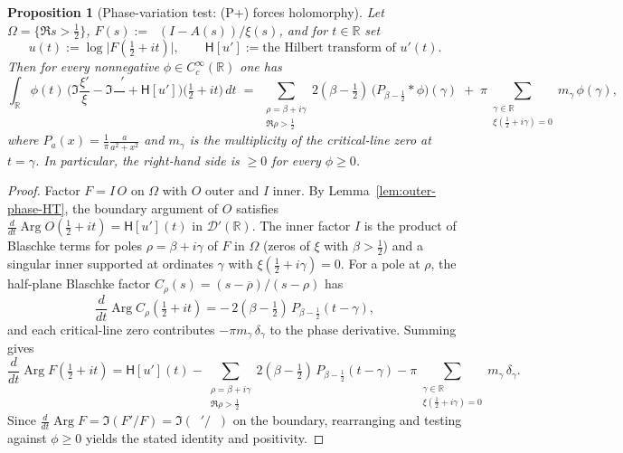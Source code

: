 \documentclass[11pt]{article}
\newtheorem{proposition}[theorem]{Proposition}
\theoremstyle{definition}
\theoremstyle{remark}
\newcommand{\R}{\mathbb{R}}
\DeclareMathOperator{\dettwo}{det_2}
\DeclareMathOperator{\Arg}{Arg}
\begin{document}
\begin{proposition}[Phase-variation test: (P+) forces holomorphy]\label{prop:Pplus-holomorphy}
Let \(\Omega=\{\Re s>\tfrac12\}\), \(F(s):=\dettwo(I-A(s))/\xi(s)\), and for \(t\in\R\) set
\[
 u(t):=\log\big|F(\tfrac12+it)\big|,\qquad
 \mathsf H[u']:=\text{the Hilbert transform of }u'(t).
\]
Then for every nonnegative \(\phi\in C_c^\infty(\R)\) one has
\[
\int_{\R}\!\phi(t)\,\Big(\Im\frac{\xi'}{\xi}-\Im\frac{\dettwo'}{\dettwo}+\mathsf H[u']\Big)\!\Big(\tfrac12+it\Big)\,dt
\;=\;\sum_{\substack{\rho=\beta+i\gamma\\ \Re\rho>\tfrac12}}\! 2(\beta-\tfrac12)\,\big(P_{\beta-\tfrac12}\!\ast\phi\big)(\gamma)
\;+\; \pi\!\!\sum_{\substack{\gamma\in\R\\ \xi(\tfrac12+i\gamma)=0}}\! m_\gamma\,\phi(\gamma),
\]
where \(P_a(x)=\frac{1}{\pi}\frac{a}{a^2+x^2}\) and \(m_\gamma\) is the multiplicity of the critical-line zero at \(t=\gamma\). In particular, the right-hand side is \(\ge 0\) for every \(\phi\ge 0\).
\end{proposition}
\begin{proof}
Factor \(F=I\,O\) on \(\Omega\) with \(O\) outer and \(I\) inner. By Lemma~\ref{lem:outer-phase-HT}, the boundary argument of \(O\) satisfies \(\frac{d}{dt}\Arg O(\tfrac12+it)=\mathsf H[u'](t)\) in \(\mathcal D'(\R)\). The inner factor \(I\) is the product of Blaschke terms for poles \(\rho=\beta+i\gamma\) of \(F\) in \(\Omega\) (zeros of \(\xi\) with \(\beta>\tfrac12\)) and a singular inner supported at ordinates \(\gamma\) with \(\xi(\tfrac12+i\gamma)=0\). For a pole at \(\rho\), the half-plane Blaschke factor \(C_\rho(s)=(s-\overline\rho)/(s-\rho)\) has
\[
\frac{d}{dt}\Arg C_\rho(\tfrac12+it)=-\,2(\beta-\tfrac12)\,P_{\beta-\tfrac12}(t-\gamma),
\]
and each critical-line zero contributes \(-\pi m_\gamma\,\delta_\gamma\) to the phase derivative. Summing gives
\[
\frac{d}{dt}\Arg F(\tfrac12+it)=\mathsf H[u'](t)
-\sum_{\substack{\rho=\beta+i\gamma\\ \Re\rho>\tfrac12}}\! 2(\beta-\tfrac12)\,P_{\beta-\tfrac12}(t-\gamma)
-\pi\!\!\sum_{\substack{\gamma\in\R\\ \xi(\tfrac12+i\gamma)=0}}\! m_\gamma\,\delta_\gamma.
\]
Since \(\frac{d}{dt}\Arg F=\Im(F'/F)=\Im(\dettwo'/\dettwo)\) on the boundary, rearranging and testing against \(\phi\ge 0\) yields the stated identity and positivity.
\end{proof}
\end{document}
